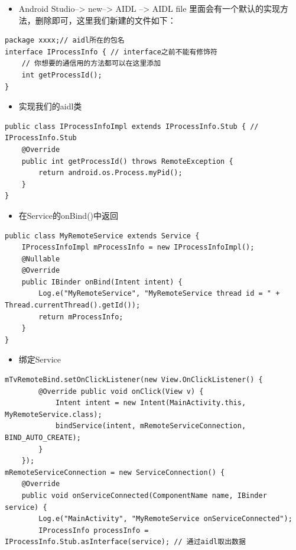 \documentclass[9pt, b5paper]{article}
\begin{document}
\begin{enumerate}
\begin{itemize}
\begin{itemize}
\item Android Studio--> new--> AIDL --> AIDL file 里面会有一个默认的实现方法，删除即可，这里我们新建的文件如下：
\end{itemize}
\end{itemize}
\begin{verbatim}
package xxxx;// aidl所在的包名
interface IProcessInfo { // interface之前不能有修饰符
	// 你想要的通信用的方法都可以在这里添加
	int getProcessId();
}
\end{verbatim}
\begin{itemize}
\item 实现我们的aidl类
\end{itemize}
\begin{verbatim}
public class IProcessInfoImpl extends IProcessInfo.Stub { // IProcessInfo.Stub
	@Override
	public int getProcessId() throws RemoteException {
  		return android.os.Process.myPid();
	}
}
\end{verbatim}
\begin{itemize}
\item 在Service的onBind()中返回
\end{itemize}
\begin{verbatim}
public class MyRemoteService extends Service {
	IProcessInfoImpl mProcessInfo = new IProcessInfoImpl();
	@Nullable
	@Override
	public IBinder onBind(Intent intent) {
  		Log.e("MyRemoteService", "MyRemoteService thread id = " + Thread.currentThread().getId());
        return mProcessInfo;
	}
}
\end{verbatim}
\begin{itemize}
\item 绑定Service
\end{itemize}
\begin{verbatim}
mTvRemoteBind.setOnClickListener(new View.OnClickListener() {
        @Override public void onClick(View v) {
            Intent intent = new Intent(MainActivity.this, MyRemoteService.class);
            bindService(intent, mRemoteServiceConnection, BIND_AUTO_CREATE);
        }
    });
mRemoteServiceConnection = new ServiceConnection() {
    @Override
    public void onServiceConnected(ComponentName name, IBinder service) {
        Log.e("MainActivity", "MyRemoteService onServiceConnected");
        IProcessInfo processInfo = IProcessInfo.Stub.asInterface(service); // 通过aidl取出数据

\end{verbatim}
\end{enumerate}
\end{document}
